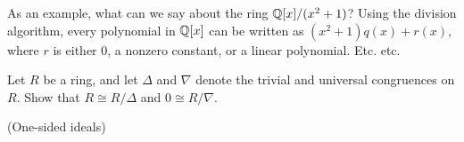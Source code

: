 As an example, what can we say about the ring \(\mathbb{Q}[x]/(x^2 + 1)\)? Using the division algorithm, every polynomial in \(\mathbb{Q}[x]\) can be written as \((x^2+1)q(x) + r(x)\), where \(r\) is either 0, a nonzero constant, or a linear polynomial. Etc. etc.



\Exercises%

\begin{exercise}
Let \(R\) be a ring, and let \(\Delta\) and \(\nabla\) denote the trivial and universal congruences on \(R\). Show that \(R \cong R/\Delta\) and \(0 \cong R/\nabla\).
\end{exercise}

\begin{exercise}
(One-sided ideals)
\end{exercise}
